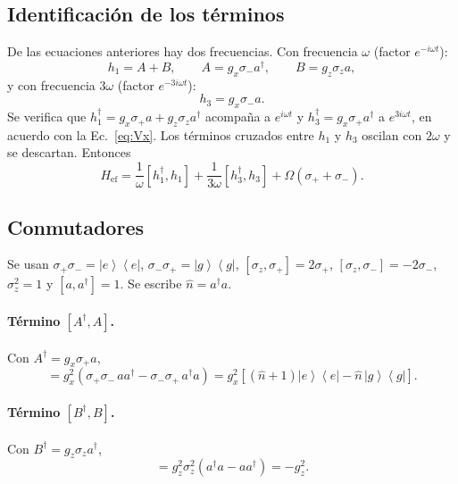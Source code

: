 \documentclass[11pt]{report}
\newcommand{\ket}[1]{\left|#1\right\rangle}
\newcommand{\bra}[1]{\left\langle#1\right|}
\newcommand{\spl}{\sigma_{+}}
\newcommand{\smi}{\sigma_{-}}
\newcommand{\Pe}{\ket{e}\!\bra{e}}
\newcommand{\Pg}{\ket{g}\!\bra{g}}
\begin{document}
\subsection{Identificaci\'on de los t\'erminos}

De las ecuaciones anteriores hay dos frecuencias. Con frecuencia $\omega$ (factor $e^{-i\omega t}$):
\begin{equation}
h_{1} = A + B,\qquad A = g_{x}\smi a^{\dagger},\qquad B = g_{z}\sigma_{z}a,
\end{equation}
y con frecuencia $3\omega$ (factor $e^{-3i\omega t}$):
\begin{equation}
h_{3} = g_{x}\smi a .
\end{equation}
Se verifica que $h_{1}^{\dagger}=g_{x}\spl a+g_{z}\sigma_{z}a^{\dagger}$ acompa\~na a $e^{i\omega t}$ y $h_{3}^{\dagger}=g_{x}\spl a^{\dagger}$ a $e^{3i\omega t}$, en acuerdo con la Ec.~\eqref{eq:Vx}. Los t\'erminos cruzados entre $h_{1}$ y $h_{3}$ oscilan con $2\omega$ y se descartan. Entonces
\begin{equation}
H_{\mathrm{ef}} = \frac{1}{\omega}\left[h_{1}^{\dagger},h_{1}\right] + \frac{1}{3\omega}\left[h_{3}^{\dagger},h_{3}\right] + \Omega(\spl+\smi).
\end{equation}

\subsection{Conmutadores}

Se usan $\spl\smi=\Pe$, $\smi\spl=\Pg$, $[\sigma_{z},\spl]=2\spl$, $[\sigma_{z},\smi]=-2\smi$, $\sigma_{z}^{2}=1$ y $[a,a^{\dagger}]=1$. Se escribe $\hat n=a^{\dagger}a$.

\paragraph{T\'ermino $[A^{\dagger},A]$.} Con $A^{\dagger}=g_{x}\spl a$,
\begin{equation}
[A^{\dagger},A] = g_{x}^{2}\left(\spl\smi\,a a^{\dagger} - \smi\spl\,a^{\dagger}a\right) = g_{x}^{2}\left[(\hat n+1)\Pe - \hat n\,\Pg\right].
\end{equation}

\paragraph{T\'ermino $[B^{\dagger},B]$.} Con $B^{\dagger}=g_{z}\sigma_{z}a^{\dagger}$,
\begin{equation}
[B^{\dagger},B] = g_{z}^{2}\sigma_{z}^{2}\left(a^{\dagger}a - a a^{\dagger}\right) = -g_{z}^{2}.
\end{equation}
\end{document}
